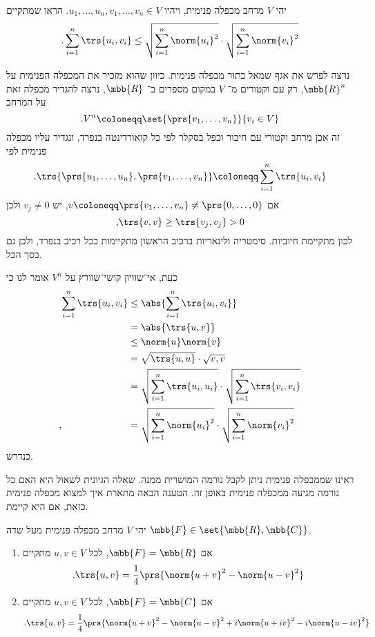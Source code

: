 \documentclass[a4paper,10pt,twoside,openany]{book}
\begin{document}
\begin{exercisechap}
יהי
$V$
מרחב מכפלה פנימית, ויהיו
$u_1, \ldots, u_n, v_1, \ldots, v_n \in V$.
הראו שמתקיים
\begin{align*}
\text{.} \sum_{i = 1}^n \trs{u_i, v_i} \leq \sqrt{{\sum_{i = 1}^n \norm{u_i}^2}} \cdot \sqrt{\sum_{i=1}^n \norm{v_i}^2}
\end{align*}
\end{exercisechap}

\begin{solution}
נרצה לפרש את אגף שמאל בתור מכפלה פנימית.
כיוון שהוא מזכיר את המכפלה הפנימית על
$\mbb{R}^n$,
רק עם וקטורים מ־%
$V$
במקום מספרים ב־%
$\mbb{R}$,
נרצה להגדיר מכפלה זאת על המרחב
\[\text{.} V^n \coloneqq \set{\prs{v_1, \ldots, v_n}}{v_i \in V}\]
זה אכן מרחב וקטורי עם חיבור וכפל בסקלר לפי כל קואורדינטה בנפרד, ונגדיר עליו מכפלה פנימית לפי
\[\text{.} \trs{\prs{u_1, \ldots, u_n}, \prs{v_1, \ldots, v_n}} \coloneqq \sum_{i = 1}^n \trs{u_i, v_i}\]
אם
$v \coloneqq \prs{v_1, \ldots, v_n} \neq \prs{0, \ldots, 0}$,
יש
$v_j \neq 0$
ולכן
\[\text{,} \trs{v,v} \geq \trs{v_j, v_j} > 0\]
לכון מתקיימת חיוביות.
סימטריה ולינאריות ברכיב הראשון מתקיימות בכל רכיב בנפרד, ולכן גם בסך הכל.

כעת, אי־שוויון קושי־שוורץ על
$V^n$
אומר לנו כי
\begin{align*}
\sum_{i = 1}^n \trs{u_i, v_i}
&\leq
\abs{\sum_{i = 1}^n \trs{u_i, v_i}}
\\&=
\abs{\trs{u,v}}
\\&\leq
\norm{u} \norm{v}
\\&=
\sqrt{\trs{u,u}} \cdot \sqrt{v,v}
\\&=
\sqrt{{\sum_{i = 1}^n \trs{u_i, u_i}}} \cdot \sqrt{\sum_{i=1}^n \trs{v_i, v_i}}
\\\text{,}\hphantom{\sum_{i = 1}^n \trs{u_i, v_i}}&=
\sqrt{{\sum_{i = 1}^n \norm{u_i}^2}} \cdot \sqrt{\sum_{i=1}^n \norm{v_i}^2}
\end{align*}
כנדרש.
\end{solution}

ראינו שממכפלה פנימית ניתן לקבל נורמה המושרית ממנה. שאלה הגיונית לשאול היא האם כל נורמה מגיעה ממכפלה פנימית באופן זה. הטענה הבאה מתארת איך למצוא מכפלה פנימית כזאת, אם היא קיימת.

\begin{proposition}
יהי
$V$
מרחב מכפלה פנימית מעל שדה
$\mbb{F} \in \set{\mbb{R}, \mbb{C}}$.

\begin{enumerate}
\item אם
$\mbb{F} = \mbb{R}$,
לכל
$u,v \in V$
מתקיים
\[\text{.} \trs{u,v} = \frac{1}{4} \prs{\norm{u + v}^2 - \norm{u-v}^2}\]

\item אם
$\mbb{F} = \mbb{C}$,
לכל
$u,v \in V$
מתקיים
\[\text{.} \trs{u,v} = \frac{1}{4} \prs{\norm{u+v}^2 - \norm{u-v}^2 + i \norm{u+iv}^2 - i\norm{u-iv}^2}\]
\end{enumerate}
\end{proposition}
\end{document}
